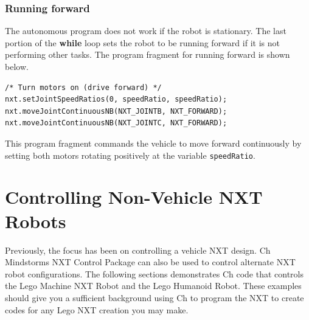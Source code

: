 \documentclass[11pt]{article}
\begin{document}
\subsubsection*{Running forward}
The autonomous program does not work if the robot is stationary. The last portion of the 
{\bf while} loop sets the robot to be running forward if it is not performing other tasks.
The program fragment for running forward is shown below.
\begin{lstlisting}
/* Turn motors on (drive forward) */
nxt.setJointSpeedRatios(0, speedRatio, speedRatio);
nxt.moveJointContinuousNB(NXT_JOINTB, NXT_FORWARD);
nxt.moveJointContinuousNB(NXT_JOINTC, NXT_FORWARD);
\end{lstlisting}
This program fragment commands the vehicle to move forward continuously by setting both motors 
rotating positively at the variable {\tt speedRatio}.

\newpage
\section{Controlling Non-Vehicle NXT Robots}
Previously, the focus has been on controlling a vehicle NXT design. Ch Mindstorms NXT Control 
Package can also be used to control alternate NXT robot configurations. The following sections 
demonstrates Ch code that controls the Lego Machine NXT Robot and the Lego Humanoid Robot. These 
examples should give you a sufficient background using Ch to program the NXT to create codes 
for any Lego NXT creation you may make.
\end{document}
